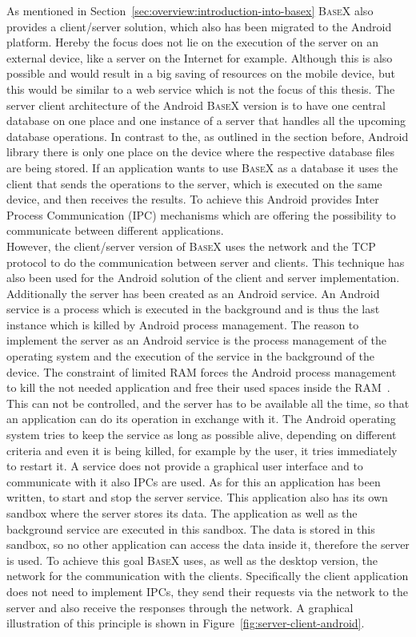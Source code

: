 As mentioned in Section~\ref{sec:overview:introduction-into-basex} \textsc{BaseX} also provides a client/server solution, which also has been migrated to the Android platform.
Hereby the focus does not lie on the execution of the server on an external device, like a server on the Internet for example.
Although this is also possible and would result in a big saving of resources on the mobile device, but this would be similar to a web service which is not the focus of this thesis.
The server client architecture of the Android \textsc{BaseX} version is to have one central database on one place and one instance of a server that handles all the upcoming database operations.
In contrast to the, as outlined in the section before, Android library there is only one place on the device where the respective database files are being stored.
If an application wants to use \textsc{BaseX} as a database it uses the client that sends the operations to the server, which is executed on the same device, and then receives the results.
To achieve this Android provides Inter Process Communication (IPC) mechanisms which are offering the possibility to communicate between different applications.\\
However, the client/server version of \textsc{BaseX} uses the network and the TCP protocol to do the communication between server and clients.
This technique has also been used for the Android solution of the client and server implementation.
Additionally the server has been created as an Android service.
An Android service is a process which is executed in the background and is thus the last instance which is killed by Android process management.
The reason to implement the server as an Android service is the process management of the operating system and the execution of the service in the background of the device.
The constraint of limited RAM forces the Android process management to kill the not needed application and free their used spaces inside the RAM~\cite{developers2011android}.
This can not be controlled, and the server has to be available all the time, so that an application can do its operation in exchange with it.
The Android operating system tries to keep the service as long as possible alive, depending on different criteria and even it is being killed, for example by the user, it tries immediately to restart it.
A service does not provide a graphical user interface and to communicate with it also IPCs are used.
As for this an application has been written, to start and stop the server service.
This application also has its own sandbox where the server stores its data.
The application as well as the background service are executed in this sandbox.
The data is stored in this sandbox, so no other application can access the data inside it, therefore the server is used.
To achieve this goal \textsc{BaseX} uses, as well as the desktop version, the network for the communication with the clients.
Specifically the client application does not need to implement IPCs, they send their requests via the network to the server and also receive the responses through the network.
A graphical illustration of this principle is shown in Figure~\ref{fig:server-client-android}.

